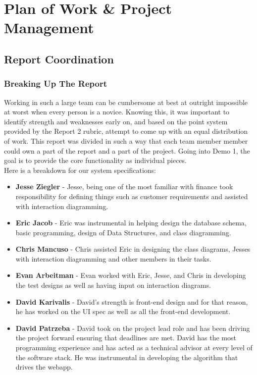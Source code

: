 \chapter{Plan of Work \& Project Management}

\section{Report Coordination}
\subsection{Breaking Up The Report}

Working in such a large team can be cumbersome at best at outright impossible
at worst when every person is a novice.  Knowing this, it was important to
identify strength and weaknesses early on, and based on the point system
provided by the Report 2 rubric, attempt to come up with an equal distribution
of work.  This report was divided in such a way that each team member member
could own a part of the report and a part of the project.  Going into Demo 1,
the goal is to provide the core functionality as individual pieces.\\

Here is a breakdown for our system specifications:\\

\begin{itemize}
\item{\textbf{Jesse Ziegler} - Jesse, being one of the most familiar with
finance took responsibility for defining things such as customer requirements
and assisted with interaction diagramming.}
\item{\textbf{Eric Jacob} - Eric was instrumental in helping design the database
schema, basic programming, design of Data Structures, and class diagramming.}
\item{\textbf{Chris Mancuso} - Chris assisted Eric in designing the class
diagrams, Jesses with interaction diagramming and other members in their tasks.}
\item{\textbf{Evan Arbeitman} - Evan worked with Eric, Jesse, and Chris in
developing the test designs as well as having input on interaction diagrams.}
\item{\textbf{David Karivalis} - David's strength is front-end design and for
that reason, he has worked on the UI spec as well as all the front-end
development.}
\item{\textbf{David Patrzeba} - David took on the project lead role and has been
driving the project forward ensuring that deadlines are met.  David has the most
programming experience and has acted as a technical advisor at every level of
the software stack.  He was instrumental in developing the algorithm that drives
the webapp.}
\end{itemize}

